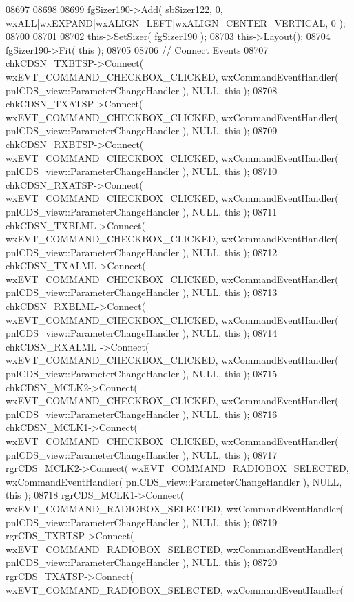 \begin{DoxyCode}
08697     
08698     
08699     fgSizer190->Add( sbSizer122, 0, wxALL|wxEXPAND|wxALIGN\_LEFT|wxALIGN\_CENTER\_VERTICAL, 0 );
08700     
08701     
08702     this->SetSizer( fgSizer190 );
08703     this->Layout();
08704     fgSizer190->Fit( \textcolor{keyword}{this} );
08705     
08706     \textcolor{comment}{// Connect Events}
08707     chkCDSN_TXBTSP->Connect( wxEVT\_COMMAND\_CHECKBOX\_CLICKED, wxCommandEventHandler( 
      pnlCDS_view::ParameterChangeHandler ), NULL, \textcolor{keyword}{this} );
08708     chkCDSN_TXATSP->Connect( wxEVT\_COMMAND\_CHECKBOX\_CLICKED, wxCommandEventHandler( 
      pnlCDS_view::ParameterChangeHandler ), NULL, \textcolor{keyword}{this} );
08709     chkCDSN_RXBTSP->Connect( wxEVT\_COMMAND\_CHECKBOX\_CLICKED, wxCommandEventHandler( 
      pnlCDS_view::ParameterChangeHandler ), NULL, \textcolor{keyword}{this} );
08710     chkCDSN_RXATSP->Connect( wxEVT\_COMMAND\_CHECKBOX\_CLICKED, wxCommandEventHandler( 
      pnlCDS_view::ParameterChangeHandler ), NULL, \textcolor{keyword}{this} );
08711     chkCDSN_TXBLML->Connect( wxEVT\_COMMAND\_CHECKBOX\_CLICKED, wxCommandEventHandler( 
      pnlCDS_view::ParameterChangeHandler ), NULL, \textcolor{keyword}{this} );
08712     chkCDSN_TXALML->Connect( wxEVT\_COMMAND\_CHECKBOX\_CLICKED, wxCommandEventHandler( 
      pnlCDS_view::ParameterChangeHandler ), NULL, \textcolor{keyword}{this} );
08713     chkCDSN_RXBLML->Connect( wxEVT\_COMMAND\_CHECKBOX\_CLICKED, wxCommandEventHandler( 
      pnlCDS_view::ParameterChangeHandler ), NULL, \textcolor{keyword}{this} );
08714     chkCDSN_RXALML ->Connect( wxEVT\_COMMAND\_CHECKBOX\_CLICKED, wxCommandEventHandler( 
      pnlCDS_view::ParameterChangeHandler ), NULL, \textcolor{keyword}{this} );
08715     chkCDSN_MCLK2->Connect( wxEVT\_COMMAND\_CHECKBOX\_CLICKED, wxCommandEventHandler( 
      pnlCDS_view::ParameterChangeHandler ), NULL, \textcolor{keyword}{this} );
08716     chkCDSN_MCLK1->Connect( wxEVT\_COMMAND\_CHECKBOX\_CLICKED, wxCommandEventHandler( 
      pnlCDS_view::ParameterChangeHandler ), NULL, \textcolor{keyword}{this} );
08717     rgrCDS_MCLK2->Connect( wxEVT\_COMMAND\_RADIOBOX\_SELECTED, wxCommandEventHandler( 
      pnlCDS_view::ParameterChangeHandler ), NULL, \textcolor{keyword}{this} );
08718     rgrCDS_MCLK1->Connect( wxEVT\_COMMAND\_RADIOBOX\_SELECTED, wxCommandEventHandler( 
      pnlCDS_view::ParameterChangeHandler ), NULL, \textcolor{keyword}{this} );
08719     rgrCDS_TXBTSP->Connect( wxEVT\_COMMAND\_RADIOBOX\_SELECTED, wxCommandEventHandler( 
      pnlCDS_view::ParameterChangeHandler ), NULL, \textcolor{keyword}{this} );
08720     rgrCDS_TXATSP->Connect( wxEVT\_COMMAND\_RADIOBOX\_SELECTED, wxCommandEventHandler( 

\end{DoxyCode}
